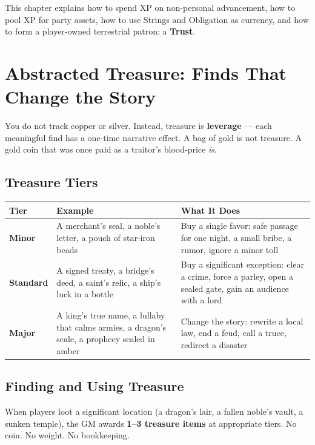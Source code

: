 This chapter explains how to spend XP on non-personal advancement, how to pool XP for party assets, how to use Strings and Obligation as currency, and how to form a player-owned terrestrial patron: a \textbf{Trust}.

\section{Abstracted Treasure: Finds That Change the Story}
\label{sec:abstracted-treasure}

You do not track copper or silver. Instead, treasure is \textbf{leverage} --- each meaningful find has a one-time narrative effect. A bag of gold is not treasure. A gold coin that was once paid as a traitor's blood-price \emph{is}.

\subsection{Treasure Tiers}
\label{subsec:treasure-tiers}

\begin{center}
\begin{tabular}{lll}
\toprule
\textbf{Tier} & \textbf{Example} & \textbf{What It Does} \\
\midrule
\textbf{Minor} & A merchant's seal, a noble's letter, a pouch of star-iron beads & Buy a single favor: safe passage for one night, a small bribe, a rumor, ignore a minor toll \\
\textbf{Standard} & A signed treaty, a bridge's deed, a saint's relic, a ship's luck in a bottle & Buy a significant exception: clear a crime, force a parley, open a sealed gate, gain an audience with a lord \\
\textbf{Major} & A king's true name, a lullaby that calms armies, a dragon's scale, a prophecy sealed in amber & Change the story: rewrite a local law, end a feud, call a truce, redirect a disaster \\
\bottomrule
\end{tabular}
\end{center}

\subsection{Finding and Using Treasure}
\label{subsec:using-treasure}

When players loot a significant location (a dragon's lair, a fallen noble's vault, a sunken temple), the GM awards \textbf{1--3 treasure items} at appropriate tiers. No coin. No weight. No bookkeeping.

